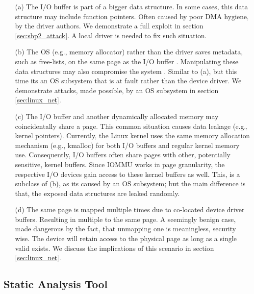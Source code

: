 \begin{enumerate}
    \item[(a)] The I/O buffer is part of a bigger data structure. In some cases, this data structure may include function pointers. Often caused by poor DMA hygiene, by the driver authors. We demonstrate a full exploit in section \ref{sec:sbp2_attack}. A local driver is needed to fix such situation.
    \item[(b)] The OS (e.g., memory allocator) rather than the driver saves metadata, such as free-lists, on the same page as the I/O buffer \cite{Cor07}. Manipulating these data structures may also compromise the system  \cite{ak09}. Similar to (a), but this time its an OS subsystem that is at fault rather than the device driver. We demonstrate attacks, made possible, by an OS subsystem in section \ref{sec:linux_net}.
    \item[(c)] The I/O buffer and another dynamically allocated memory may coincidentally share a page. This common situation causes data leakage (e.g., kernel pointers).
    Currently, the Linux kernel uses the same memory allocation mechanism (e.g., kmalloc) for both I/O buffers and regular kernel memory use. Consequently, I/O buffers often share pages with other, potentially sensitive, kernel buffers. Since IOMMU works in page granularity, the respective I/O devices gain access to these kernel buffers as well. This, is a subclass of (b), as its caused by an OS subsystem; but the main difference is that, the exposed data structures are leaked randomly.
     \item[(d)] The same page is mapped multiple times due to co-located device driver buffers. Resulting in multiple \iova{} to the same page. A seemingly benign case, made dangerous by the fact, that unmapping one \iova{} is meaningless, security wise. The device will retain access to the physical page as long as a single valid \iova{} exists. We discuss the implications of this scenario in section \ref{sec:linux_net}.
\end{enumerate}

\subsection{Static Analysis Tool}

